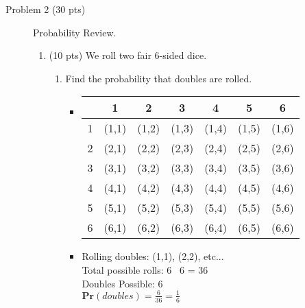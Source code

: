 \documentclass[11pt]{article}
\renewcommand{\Pr}{\ensuremath{\mathbf{Pr}}\xspace}
\begin{document}
\begin{description}
 \item[Problem 2 (30 pts)] Probability Review.
\begin{enumerate}
 \item
(10 pts) We roll two fair 6-sided dice.
\begin{enumerate}
 \item
Find the probability that doubles are rolled.
	\begin{itemize}
	\item
		\begin{tabular}{|c|c|c|c|c|c|c|} 
		\hline
		 & 1 & 2 & 3 & 4 & 5 & 6
		\\ \hline
		1 & (1,1) & (1,2) & (1,3) & (1,4) & (1,5) & (1,6)
		\\ \hline
		2 & (2,1) & (2,2) & (2,3) & (2,4) & (2,5) & (2,6)
		\\ \hline
		3 & (3,1) & (3,2) & (3,3) & (3,4) & (3,5) & (3,6)
		\\ \hline
		4 & (4,1) & (4,2) & (4,3) & (4,4) & (4,5) & (4,6)
		\\ \hline
		5 & (5,1) & (5,2) & (5,3) & (5,4) & (5,5) & (5,6)
		\\ \hline
		6 & (6,1) & (6,2) & (6,3) & (6,4) & (6,5) & (6,6)
		\\ \hline
		\end{tabular}
	\item
	Rolling doubles: (1,1), (2,2), etc... \\
	Total possible rolls: 6 \texttimes \ 6 = 36 \\
	Doubles Possible: 6 \\
	$\Pr(doubles) = \frac{6}{36} = \frac{1}{6}$
	\end{itemize}	


\end{enumerate}
\end{enumerate}
\end{description}
\end{document}
